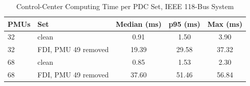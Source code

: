 \begin{table}[t]
\caption{Control-Center Computing Time per PDC Set, IEEE 118-Bus System}
\label{tab:bench}
\centering
\footnotesize
\begin{tabular}{@{}llccc@{}}
\toprule
PMUs & Set & Median (ms) & p95 (ms) & Max (ms) \\
\midrule
32 & clean & 0.91 & 1.50 & 3.90 \\
32 & FDI, PMU 49 removed & 19.39 & 29.58 & 37.32 \\
68 & clean & 0.85 & 1.53 & 2.30 \\
68 & FDI, PMU 49 removed & 37.60 & 51.46 & 56.84 \\
\bottomrule
\end{tabular}
\end{table}
